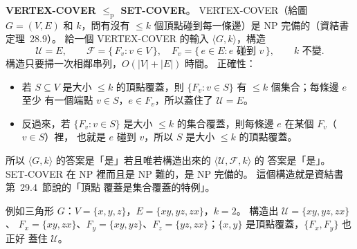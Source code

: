 \begin{pastsoln}
\textbf{VERTEX-COVER $\le_{\mathrm{p}}$ SET-COVER}。 VERTEX-COVER（給圖 $G = (V, E)$ 和 $k$，問有沒有
$\le k$ 個頂點碰到每一條邊）是 NP 完備的（資結書定理~28.9）。 給一個 VERTEX-COVER 的輸入 $\langle G, k
\rangle$，構造
\[
\mathcal{U} = E, \qquad \mathcal{F} = \{\, F_v : v \in V \,\}, \quad F_v = \{\, e \in E : e \text{ 碰到 } v \,\},
\qquad k \text{ 不變}.
\]
構造只要掃一次相鄰串列，$O(|V| + |E|)$ 時間。 正確性：
\begin{itemize}
\item 若 $S \subseteq V$ 是大小 $\le k$ 的頂點覆蓋，則 $\{F_v : v \in S\}$ 有 $\le k$ 個集合；每條邊 $e$ 至少
有一個端點 $v \in S$，$e \in F_v$，所以蓋住了 $\mathcal{U} = E$。
\item 反過來，若 $\{F_v : v \in S\}$ 是大小 $\le k$ 的集合覆蓋，則每條邊 $e$ 在某個 $F_v$（$v \in S$）裡，
也就是 $e$ 碰到 $v$，所以 $S$ 是大小 $\le k$ 的頂點覆蓋。
\end{itemize}
所以 $\langle G, k\rangle$ 的答案是「是」若且唯若構造出來的 $\langle \mathcal{U}, \mathcal{F}, k\rangle$ 的
答案是「是」。 SET-COVER 在 NP 裡而且是 NP 難的，是 NP 完備的。 這個構造就是資結書第~29.4~節說的「頂點
覆蓋是集合覆蓋的特例」。

例如三角形 $G$：$V = \{x, y, z\}$，$E = \{xy, yz, zx\}$，$k = 2$。 構造出 $\mathcal{U} = \{xy, yz, zx\}$、
$F_x = \{xy, zx\}$、$F_y = \{xy, yz\}$、$F_z = \{yz, zx\}$；$\{x, y\}$ 是頂點覆蓋，$\{F_x, F_y\}$ 也正好
蓋住 $\mathcal{U}$。
\end{pastsoln}
